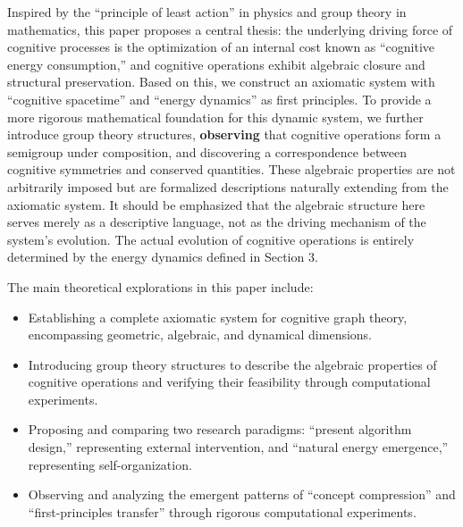 \documentclass[10pt,onecolumn]{article}
\begin{document}
Inspired by the “principle of least action” in physics and group theory in mathematics, this paper proposes a central thesis: the underlying driving force of cognitive processes is the optimization of an internal cost known as “cognitive energy consumption,” and cognitive operations exhibit algebraic closure and structural preservation. Based on this, we construct an axiomatic system with “cognitive spacetime” and “energy dynamics” as first principles. To provide a more rigorous mathematical foundation for this dynamic system, we further introduce group theory structures, \textbf{observing} that cognitive operations form a semigroup under composition, and discovering a correspondence between cognitive symmetries and conserved quantities. These algebraic properties are not arbitrarily imposed but are formalized descriptions naturally extending from the axiomatic system. It should be emphasized that the algebraic structure here serves merely as a descriptive language, not as the driving mechanism of the system’s evolution. The actual evolution of cognitive operations is entirely determined by the energy dynamics defined in Section 3.

The main theoretical explorations in this paper include:
\begin{itemize}
    \item Establishing a complete axiomatic system for cognitive graph theory, encompassing geometric, algebraic, and dynamical dimensions.
    \item Introducing group theory structures to describe the algebraic properties of cognitive operations and verifying their feasibility through computational experiments.
    \item Proposing and comparing two research paradigms: “present algorithm design,” representing external intervention, and “natural energy emergence,” representing self-organization.
    \item Observing and analyzing the emergent patterns of “concept compression” and “first-principles transfer” through rigorous computational experiments.
\end{itemize}
\end{document}
